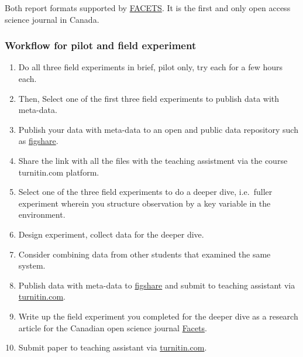 \documentclass[
]{book}
\providecommand{\tightlist}{%
  \setlength{\itemsep}{0pt}\setlength{\parskip}{0pt}}
\begin{document}
Both report formats supported by \href{https://www.facetsjournal.com/about/}{FACETS}. It is the first and only open access science journal in Canada.

\hypertarget{workflow-for-pilot-and-field-experiment}{%
\subsubsection*{Workflow for pilot and field experiment}\label{workflow-for-pilot-and-field-experiment}}

\begin{enumerate}
\def\labelenumi{\arabic{enumi}.}
\tightlist
\item
  Do all three field experiments in brief, pilot only, try each for a few hours each.
\item
  Then, Select one of the first three field experiments to publish data with meta-data.\\
\item
  Publish your data with meta-data to an open and public data repository such as \href{https://figshare.com}{figshare}.\\
\item
  Share the link with all the files with the teaching assistment via the course turnitin.com platform.\\
\item
  Select one of the three field experiments to do a deeper dive, i.e.~fuller experiment wherein you structure observation by a key variable in the environment.\\
\item
  Design experiment, collect data for the deeper dive.\\
\item
  Consider combining data from other students that examined the same system.
\item
  Publish data with meta-data to \href{https://figshare.com}{figshare} and submit to teaching assistant via \href{https://www.turnitin.com}{turnitin.com}.\\
\item
  Write up the field experiment you completed for the deeper dive as a research article for the Canadian open science journal \href{https://www.facetsjournal.com/authors/instructions/}{Facets}.\\
\item
  Submit paper to teaching assistant via \href{https://www.turnitin.com}{turnitin.com}.
\end{enumerate}
\end{document}
